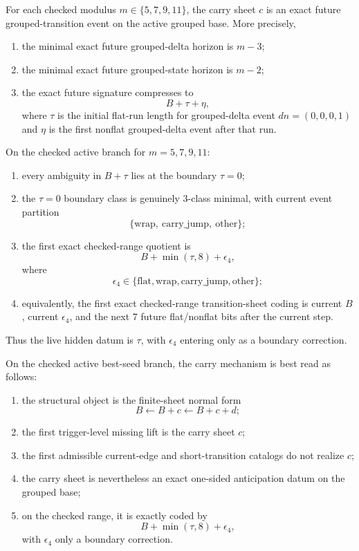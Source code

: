 \begin{proposition}
For each checked modulus $m\in\{5,7,9,11\}$, the carry sheet $c$ is an exact future grouped-transition event on the active grouped base. More precisely,
\begin{enumerate}
\item the minimal exact future grouped-delta horizon is $m-3$;
\item the minimal exact future grouped-state horizon is $m-2$;
\item the exact future signature compresses to
\[
B+\tau+\eta,
\]
where $\tau$ is the initial flat-run length for grouped-delta event $dn=(0,0,0,1)$ and $\eta$ is the first nonflat grouped-delta event after that run.
\end{enumerate}
\end{proposition}

\begin{proposition}
On the checked active branch for $m=5,7,9,11$:
\begin{enumerate}
\item every ambiguity in $B+\tau$ lies at the boundary $\tau=0$;
\item the $\tau=0$ boundary class is genuinely $3$-class minimal, with current event partition
\[
\{\mathrm{wrap},\ \mathrm{carry\_jump},\ \mathrm{other}\};
\]
\item the first exact checked-range quotient is
\[
B+\min(\tau,8)+\epsilon_4,
\]
where
\[
\epsilon_4\in\{\mathrm{flat},\mathrm{wrap},\mathrm{carry\_jump},\mathrm{other}\};
\]
\item equivalently, the first exact checked-range transition-sheet coding is current $B$, current $\epsilon_4$, and the next $7$ future flat/nonflat bits after the current step.
\end{enumerate}
Thus the live hidden datum is $\tau$, with $\epsilon_4$ entering only as a boundary correction.
\end{proposition}

\begin{corollary}
On the checked active best-seed branch, the carry mechanism is best read as follows:
\begin{enumerate}
\item the structural object is the finite-sheet normal form
\[
B \leftarrow B+c \leftarrow B+c+d;
\]
\item the first trigger-level missing lift is the carry sheet $c$;
\item the first admissible current-edge and short-transition catalogs do not realize $c$;
\item the carry sheet is nevertheless an exact one-sided anticipation datum on the grouped base;
\item on the checked range, it is exactly coded by
\[
B+\min(\tau,8)+\epsilon_4,
\]
with $\epsilon_4$ only a boundary correction.
\end{enumerate}
\end{corollary}
